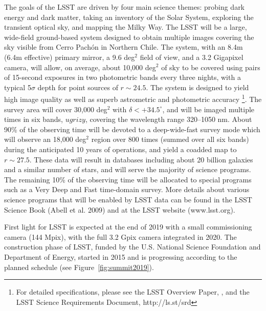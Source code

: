 \documentclass{iau}
\begin{document}
The goals of the LSST are driven by four main science themes: probing dark energy and dark matter, 
taking an inventory of the Solar System, exploring the transient optical sky, and mapping the 
Milky Way. The LSST will be a large, wide-field ground-based system designed to obtain multiple 
images covering the sky visible from Cerro Pach\'{o}n in Northern Chile. 
The system, with an 8.4m (6.4m effective) primary mirror, a 9.6 deg$^2$ field 
of view, and a 3.2 Gigapixel camera, will allow, on average, about 10,000 deg$^2$ of sky to be covered 
using pairs of 15-second exposures in two photometric bands every three nights, 
with a typical 5$\sigma$ depth for point sources of $r\sim24.5$. The system is designed to 
yield high image quality as well as superb astrometric and photometric accuracy \footnote{For 
detailed specifications, please see the LSST Overview Paper,
\cite{Ivezic08LSST}, and the LSST Science Requirements Document, http://ls.st/srd}. 
The survey area will cover 30,000 deg$^2$ with $\delta<+34.5^\circ$, and will be imaged multiple times in six bands, $ugrizy$, covering the wavelength range 320--1050 nm. About 90\% of the 
observing time will be devoted to a deep-wide-fast survey mode which will observe an
18,000 deg$^2$ region over 800 times (summed over all six bands) during the anticipated 
10 years of operations, and yield a coadded map to $r\sim27.5$. These data will result in 
databases including about 20 billion galaxies and a similar number of stars, and will 
serve the majority of science programs. The remaining 10\% of the observing time 
will be allocated to special programs such as a Very Deep and Fast time-domain 
survey. More details about various science programs that will be enabled by LSST data
can be found in the LSST Science Book (Abell et al. 2009) and at the LSST website (www.lsst.org). 

First light for LSST is expected at the end of  2019 with a small commissioning camera (144 Mpix), with 
the full 3.2 Gpix camera integrated in 2020. The construction phase of LSST, funded by the U.S. 
National Science Foundation and Department of Energy, started in 2015 and is progressing
according to the planned schedule (see Figure~\ref{fig:summit2019}). 
\end{document}
